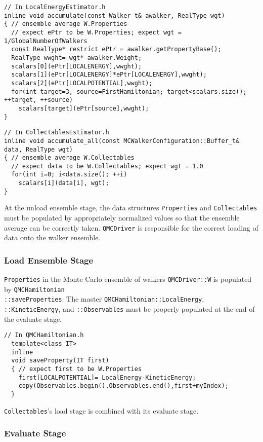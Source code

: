 \begin{lstlisting}
// In LocalEnergyEstimator.h
inline void accumulate(const Walker_t& awalker, RealType wgt)
{ // ensemble average W.Properties
  // expect ePtr to be W.Properties; expect wgt = 1/GlobalNumberOfWalkers
  const RealType* restrict ePtr = awalker.getPropertyBase();
  RealType wwght= wgt* awalker.Weight;
  scalars[0](ePtr[LOCALENERGY],wwght);
  scalars[1](ePtr[LOCALENERGY]*ePtr[LOCALENERGY],wwght);
  scalars[2](ePtr[LOCALPOTENTIAL],wwght);
  for(int target=3, source=FirstHamiltonian; target<scalars.size(); ++target, ++source)
    scalars[target](ePtr[source],wwght);
}
\end{lstlisting}

\begin{lstlisting}
// In CollectablesEstimator.h
inline void accumulate_all(const MCWalkerConfiguration::Buffer_t& data, RealType wgt)
{ // ensemble average W.Collectables
  // expect data to be W.Collectables; expect wgt = 1.0
  for(int i=0; i<data.size(); ++i)
    scalars[i](data[i], wgt);
}
\end{lstlisting}

At the unload ensemble stage, the data structures \verb|Properties| and \verb|Collectables| must be populated by appropriately normalized values so that the ensemble average can be correctly taken. \verb|QMCDriver| is responsible for the correct loading of data onto the walker ensemble.

\subsubsection{Load Ensemble Stage}
\verb|Properties| in the Monte Carlo ensemble of walkers \verb|QMCDriver::W| is populated by \verb|QMCHamiltonian|\\ \verb|::saveProperties|. The master \verb|QMCHamiltonian::LocalEnergy|, \verb|::KineticEnergy|, and \verb|::Observables| must be properly populated at the end of the evaluate stage.
\begin{lstlisting}
// In QMCHamiltonian.h
  template<class IT>
  inline
  void saveProperty(IT first)
  { // expect first to be W.Properties
    first[LOCALPOTENTIAL]= LocalEnergy-KineticEnergy;
    copy(Observables.begin(),Observables.end(),first+myIndex);
  }
\end{lstlisting}

\verb|Collectables|'s load stage is combined with its evaluate stage.

\subsubsection{Evaluate Stage}

